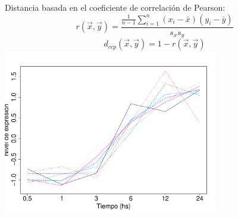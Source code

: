 \documentclass[serif,9pt, t]{beamer}
\begin{document}
\begin{frame}
\begin{columns}[T]
	Distancia basada en el coeficiente de correlación de Pearson:\\
	\begin{equation}
		r(\vec{x}, \vec{y}) = \frac{\frac{1}{n-1}\sum\limits_{i=1}^n(x_i-\bar{x})(y_i-\bar{y})}{s_x s_y}
	\end{equation}
	\begin{equation}
		d_{ccp}(\vec{x}, \vec{y}) = 1-r(\vec{x}, \vec{y})
	\end{equation}
	\centering	
	\includegraphics[width=0.7\textwidth]{perfiles_coregulados.pdf}
\end{columns}

\end{frame}
\end{document}
